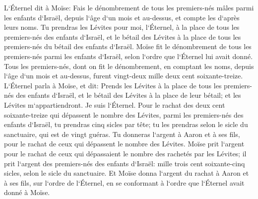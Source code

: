 \verse L`Éternel dit à Moïse: Fais le dénombrement de tous les premiers-nés mâles parmi les enfants d`Israël, depuis l`âge d`un mois et au-dessus, et compte les d`après leurs noms. 
\verse Tu prendras les Lévites pour moi, l`Éternel, à la place de tous les premiers-nés des enfants d`Israël, et le bétail des Lévites à la place de tous les premiers-nés du bétail des enfants d`Israël. 
\verse Moïse fit le dénombrement de tous les premiers-nés parmi les enfants d`Israël, selon l`ordre que l`Éternel lui avait donné. 
\verse Tous les premiers-nés, dont on fit le dénombrement, en comptant les noms, depuis l`âge d`un mois et au-dessus, furent vingt-deux mille deux cent soixante-treize. 
\verse L`Éternel parla à Moïse, et dit: 
\verse Prends les Lévites à la place de tous les premiers-nés des enfants d`Israël, et le bétail des Lévites à la place de leur bétail; et les Lévites m`appartiendront. Je suis l`Éternel. 
\verse Pour le rachat des deux cent soixante-treize qui dépassent le nombre des Lévites, parmi les premiers-nés des enfants d`Israël, 
\verse tu prendras cinq sicles par tête; tu les prendras selon le sicle du sanctuaire, qui est de vingt guéras. 
\verse Tu donneras l`argent à Aaron et à ses fils, pour le rachat de ceux qui dépassent le nombre des Lévites. 
\verse Moïse prit l`argent pour le rachat de ceux qui dépassaient le nombre des rachetés par les Lévites; 
\verse il prit l`argent des premiers-nés des enfants d`Israël: mille trois cent soixante-cinq sicles, selon le sicle du sanctuaire. 
\verse Et Moïse donna l`argent du rachat à Aaron et à ses fils, sur l`ordre de l`Éternel, en se conformant à l`ordre que l`Éternel avait donné à Moïse. 

